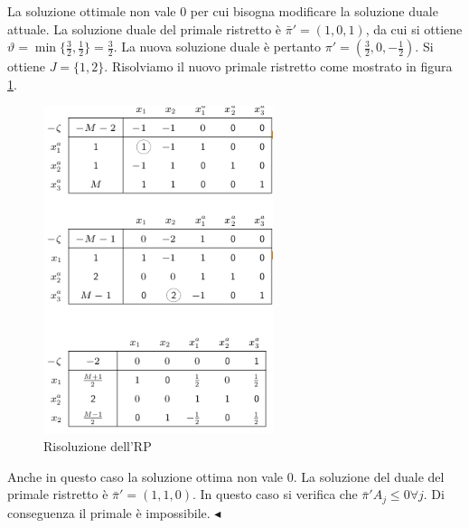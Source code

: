 \documentclass[11pt]{book}
\begin{document}
La soluzione ottimale non vale 0 per cui bisogna modificare la
soluzione duale attuale. La soluzione duale del primale ristretto \`e
$\bar{\pi}' = (1,0,1)$, da cui si ottiene $\vartheta = \min
\{\frac{3}{2}, \frac{1}{2} \} = \frac{3}{2}$. La nuova soluzione duale
\`e pertanto $\pi' = (\frac{3}{2},0,-\frac{1}{2})$. Si ottiene $J = \{
1,2\}$. Risolviamo il nuovo primale ristretto come mostrato in figura
\ref{cap5tab512bis}.

\begin{figure}[h!]
  \centering
  \includegraphics[width=0.6\textwidth]{images/cap5tab512bis.png}
  \caption{Risoluzione dell'RP}
  \label{cap5tab512bis}
\end{figure}

Anche in questo caso la soluzione ottima non vale 0. La soluzione del
duale del primale ristretto \`e $\bar{\pi}' = (1,1,0)$. In questo caso
si verifica che $\bar{\pi}'A_j \leq 0 \forall j$. Di conseguenza il
primale \`e impossibile. $\blacktriangleleft$\vspace{11pt}
\end{document}
